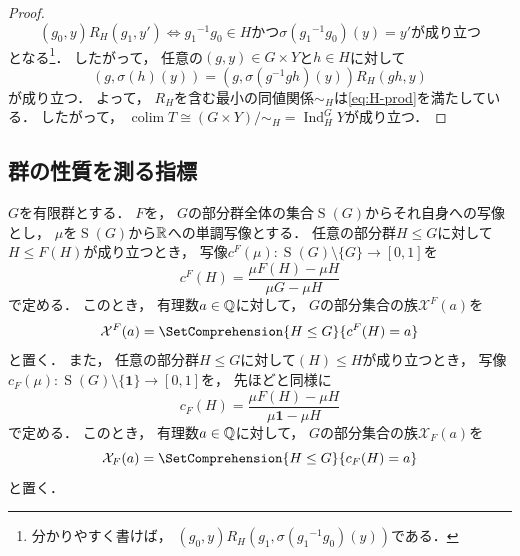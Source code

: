 \documentclass{jlreq}
\DeclareMathOperator{\SubGrps}{S}
\newcommand{\IntervalCC}[2]{\left[ #1, #2 \right]}
\newcommand{\Ind}[2]{\mathop{\mathrm{Ind}}\nolimits_{#1}^{#2}}
\newcommand{\TrivGrp}{\mathbf{1}}
\renewcommand{\Colim}{\mathop{\mathrm{colim}}}
\begin{document}
\begin{proof}
		\begin{equation}
			(g_0, y) R_H (g_1, y')
			\iff \text{${g_1}^{-1} g_0 \in H$かつ$\sigma({g_1}^{-1} g_0)(y) = y'$が成り立つ}
		\end{equation}
		となる\footnote{
			分かりやすく書けば，
			$(g_0, y) R_H (g_1, \sigma({g_1}^{-1} g_0)(y))$である．
		}．
		したがって，
		任意の$(g, y) \in G \times Y$と$h \in H$に対して
		\begin{equation}
			(g, \sigma(h)(y)) = (g, \sigma(g^{-1} g h)(y)) R_H (gh, y) \label{eq:H-prod}
		\end{equation}
		が成り立つ．
		よって，
		$R_H$を含む最小の同値関係$\sim_H$は\cref{eq:H-prod}を満たしている．
		したがって，
		$\Colim T \cong (G \times Y)/{\sim_H} = \Ind{H}{G} Y$が成り立つ．
	\end{proof}
	
	\subsection{群の性質を測る指標}
	
	$G$を有限群とする．
	$F$を，
	$G$の部分群全体の集合$\SubGrps(G)$からそれ自身への写像とし，
	$\mu$を$\SubGrps(G)$から$\mathbb{R}$への単調写像とする．
	任意の部分群$H \le G$に対して$H \le F(H)$が成り立つとき，
	写像$c^F(\mu) \colon \SubGrps(G) \setminus \{G\} \to \IntervalCC{0}{1}$を
	\begin{equation}
		c^F(H)
		= \frac{\mu{F(H)} - \mu{H}}{\mu{G} - \mu{H}}
	\end{equation}
	で定める．
	このとき，
	有理数$a \in \mathbb{Q}$に対して，
	$G$の部分集合の族$\mathcal{X}^F(a)$を
	\begin{equation}
		\mathcal{X}^F(a)
		= \SetComprehension{H \le G}{c^F(H) = a}
	\end{equation}
	と置く．
	また，
	任意の部分群$H \le G$に対して$(H) \le H$が成り立つとき，
	写像$c_F(\mu) \colon \SubGrps(G) \setminus \{\TrivGrp\} \to \IntervalCC{0}{1}$を，
	先ほどと同様に
	\begin{equation}
		c_F(H)
		= \frac{\mu{F(H)} - \mu{H}}{\mu \TrivGrp - \mu{H}}
	\end{equation}
	で定める．
	このとき，
	有理数$a \in \mathbb{Q}$に対して，
	$G$の部分集合の族$\mathcal{X}_F(a)$を
	\begin{equation}
		\mathcal{X}_F(a)
		= \SetComprehension{H \le G}{c_F(H) = a}
	\end{equation}
	と置く．
	
\end{document}
